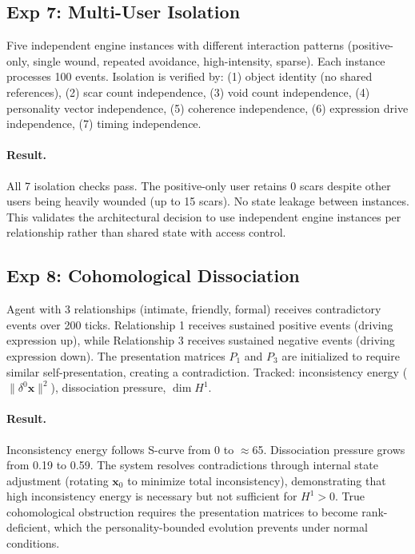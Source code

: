 \documentclass[11pt]{article}
\begin{document}
\subsection{Exp 7: Multi-User Isolation}

Five independent engine instances with different interaction patterns (positive-only, single wound, repeated avoidance, high-intensity, sparse). Each instance processes 100 events. Isolation is verified by: (1) object identity (no shared references), (2) scar count independence, (3) void count independence, (4) personality vector independence, (5) coherence independence, (6) expression drive independence, (7) timing independence.

\paragraph{Result.} All 7 isolation checks pass. The positive-only user retains 0 scars despite other users being heavily wounded (up to 15 scars). No state leakage between instances. This validates the architectural decision to use independent engine instances per relationship rather than shared state with access control.

\subsection{Exp 8: Cohomological Dissociation}

Agent with 3 relationships (intimate, friendly, formal) receives contradictory events over 200 ticks. Relationship 1 receives sustained positive events (driving expression up), while Relationship 3 receives sustained negative events (driving expression down). The presentation matrices $P_1$ and $P_3$ are initialized to require similar self-presentation, creating a contradiction. Tracked: inconsistency energy ($\|\delta^0 \mathbf{x}\|^2$), dissociation pressure, $\dim H^1$.

\paragraph{Result.} Inconsistency energy follows S-curve from 0 to $\approx$65. Dissociation pressure grows from 0.19 to 0.59. The system resolves contradictions through internal state adjustment (rotating $\mathbf{x}_0$ to minimize total inconsistency), demonstrating that high inconsistency energy is necessary but not sufficient for $H^1 > 0$. True cohomological obstruction requires the presentation matrices to become rank-deficient, which the personality-bounded evolution prevents under normal conditions.
\end{document}
